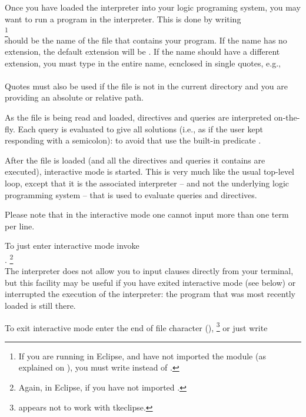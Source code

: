 
Once you have loaded the interpreter into your logic programing system, you
may want to run a program in the interpreter. This is done by
writing\\
\ind{}%
\footnote{
  If you are running in Eclipse, and have not imported the module 
  (as explained on ), you must write 
  instead of .
}\\
 should be the name of the file that contains your program.
If the name has no extension, the default extension will be .  If
the name should have a different extension, you must type in the entire name,
ecnclosed in single quotes, e.g.,\\
\ind{}\\
Quotes must also be used if the file is not in the current directory and you
are providing an absolute or relative path.

As the file is being read and loaded, directives and queries are interpreted
on-the-fly. Each query is evaluated to give all solutions (i.e., as if the
user kept responding with a semicolon): to avoid that use the built-in
predicate .

After the file is loaded (and all the directives and queries it contains are
executed), interactive mode is started.  This is very much like the usual
top-level loop, except that it is the associated interpreter -- and not the
underlying logic programming system -- that is used to evaluate queries and
directives.

Please note that in the interactive mode one cannot input more than one term
per line.


To just enter interactive mode invoke\\
\ind{}.%
\footnote{Again,  in Eclipse, if you have not imported
  .}\\
 The interpreter does not allow you to input clauses directly from your
 terminal, but this facility may be useful if you have exited interactive
 mode (see below) or interrupted the execution of the interpreter: the
 program that was most recently loaded is still there.

To exit interactive mode enter the end of file character
(),%
\footnote{
   appears not to work with tkeclipse.}
or just write\\
\ind{}

